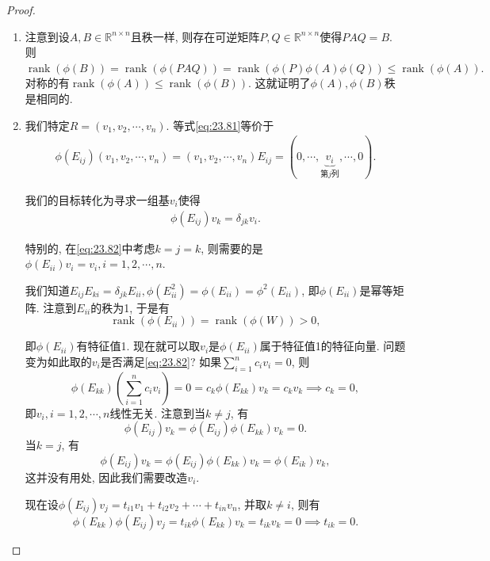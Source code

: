 \documentclass[../../main.tex]{subfiles}%
\begin{document}
\begin{proof}
\begin{enumerate}[(1)]
\item 注意到设$A,B \in \mathbb{R}^{n \times n}$且秩一样, 则存在可逆矩阵$P,Q \in \mathbb{R}^{n \times n}$使得$PAQ = B$. 则
$\operatorname{rank}(\phi(B)) = \operatorname{rank}(\phi(PAQ)) = \operatorname{rank}(\phi(P)\phi(A)\phi(Q)) \leqslant \operatorname{rank}(\phi(A)).$
对称的有$\operatorname{rank}(\phi(A)) \leqslant \operatorname{rank}(\phi(B))$. 这就证明了$\phi(A),\phi(B)$秩是相同的.

\item 我们特定$R = (v_1,v_2,\cdots,v_n)$. 等式\eqref{eq:23.81}等价于
\begin{align*}
\phi (E_{ij})(v_1,v_2,\cdots ,v_n)=(v_1,v_2,\cdots ,v_n)E_{ij}=\left( 0,\cdots ,\underset{\text{第}j\text{列}}{\underbrace{v_i}},\cdots ,0 \right) .
\end{align*}

我们的目标转化为寻求一组基$v_i$使得
\begin{align}
\phi(E_{ij})v_k = \delta_{jk}v_i. \label{eq:23.82}
\end{align}

特别的, 在\eqref{eq:23.82}中考虑$k = j = k$, 则需要的是
$\phi(E_{ii})v_i = v_i, i = 1,2,\cdots,n.$

我们知道$E_{ij}E_{ki} = \delta_{jk}E_{ii}, \phi(E_{ii}^2) = \phi(E_{ii}) = \phi^2(E_{ii})$, 即$\phi(E_{ii})$是幂等矩阵. 注意到$E_{ii}$的秩为1, 于是有
$$\operatorname{rank}(\phi(E_{ii})) = \operatorname{rank}(\phi(W)) > 0,$$

即$\phi(E_{ii})$有特征值1. 现在就可以取$v_i$是$\phi(E_{ii})$属于特征值1的特征向量. 问题变为如此取的$v_i$是否满足\eqref{eq:23.82}?
如果$\sum_{i=1}^n c_i v_i = 0$, 则
$$\phi(E_{kk})\left(\sum_{i=1}^n c_i v_i\right) = 0 = c_k \phi(E_{kk})v_k = c_k v_k \implies c_k = 0,$$
即$v_i, i = 1,2,\cdots,n$线性无关.
注意到当$k \neq j$, 有
$$\phi(E_{ij})v_k = \phi(E_{ij})\phi(E_{kk})v_k = 0.$$
当$k = j$, 有
$$\phi(E_{ij})v_k = \phi(E_{ij})\phi(E_{kk})v_k = \phi(E_{ik})v_k,$$
这并没有用处, 因此我们需要改造$v_i$.

现在设$\phi(E_{ij})v_j = t_{i1}v_1 + t_{i2}v_2 + \cdots + t_{in}v_n$, 并取$k \neq i$, 则有
$$\phi(E_{kk})\phi(E_{ij})v_j = t_{ik}\phi(E_{kk})v_k = t_{ik}v_k = 0 \implies t_{ik} = 0.$$


\end{enumerate}
\end{proof}
\end{document}
